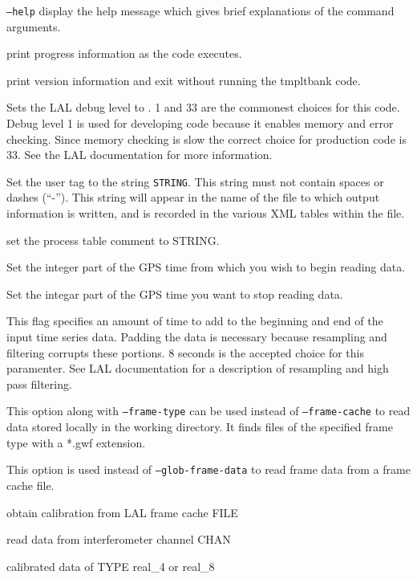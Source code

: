 \begin{entry}
\item[\texttt{--help}] display the help message which gives brief explanations
of the command arguments.  
\item[\option{--verbose}] print progress information as the code executes.
\item[\option{--version}] print version information and exit without running 
the tmpltbank code. 
\item[\option{--debug-level LEVEL}] Sets the LAL debug level to .  
1 and 33 are the commonest choices for this code.  Debug level 1 is used for 
developing code because it enables memory and error checking.  Since memory 
checking is slow the correct choice for production code is 33.  
See the LAL documentation for more information.  
\item[\option{--user-tag STRING}] Set the user tag to the string \texttt{STRING}.  
This string must not contain spaces or dashes (``-'').  This string will appear 
in the name of the file to which output information is written, and is recorded 
in the various XML tables within the file.
\item[\option{--comment STRING}] set the process table comment to STRING.
\item[\option{--gps-start-time SEC}] Set the integer part of the GPS time from 
which you wish to begin reading data.
\item[\option{--gps-end-time SEC}] Set the integar part of the GPS time you want
to stop reading data. 
\item[\option{--pad-data T}] This flag specifies an amount of time to add to 
the beginning and end of the input time series data.  Padding the data is 
necessary because resampling and filtering corrupts these portions. 
8 seconds is the accepted choice for this paramenter.  See LAL documentation 
for a description of resampling and high pass filtering.  
\item[\option{--glob-frame-data}] This option along with \texttt{--frame-type}
can be used instead of \texttt{--frame-cache} to read data stored locally in 
the working directory.  It finds files of the specified frame type with a *.gwf 
extension. 
\item[\option{--frame-cache}] This option is used instead of 
\texttt{--glob-frame-data} to read frame data from a frame cache file. 
\item[\option{--calibration-cache FILE}] obtain calibration from LAL frame 
cache FILE
\item[\option{--channel-name CHAN}] read data from interferometer channel CHAN
\item[\option{--calibrated-data TYPE}] calibrated data of TYPE real_4 or real_8


\end{entry}
